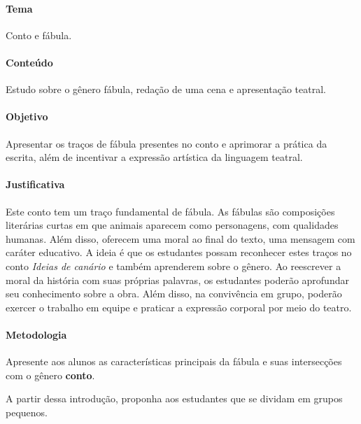 \documentclass[11pt]{extarticle}
\begin{document}

\paragraph{Tema} Conto e fábula.

\paragraph{Conteúdo} Estudo sobre o gênero fábula, redação de uma cena e apresentação teatral.

\paragraph{Objetivo} Apresentar os traços de fábula presentes no conto e aprimorar a prática da escrita, além de incentivar a expressão artística da linguagem teatral.

\paragraph{Justificativa} Este conto tem um traço fundamental de fábula. As fábulas são composições literárias curtas em que animais aparecem como personagens, com qualidades humanas. Além disso, oferecem uma moral ao final do texto, uma mensagem com caráter educativo. A ideia é que os estudantes possam reconhecer estes traços no conto \textit{Ideias de canário} e também aprenderem sobre o gênero. Ao reescrever a moral da história com suas próprias palavras, os estudantes poderão aprofundar seu conhecimento sobre a obra. Além disso, na convivência em grupo, poderão exercer o trabalho em equipe e praticar a expressão corporal por meio do teatro. 

\paragraph{Metodologia} Apresente aos alunos as características principais da fábula e suas intersecções com o gênero \textbf{conto}.

A partir dessa introdução, proponha aos estudantes que se dividam em grupos pequenos.
\end{document}
